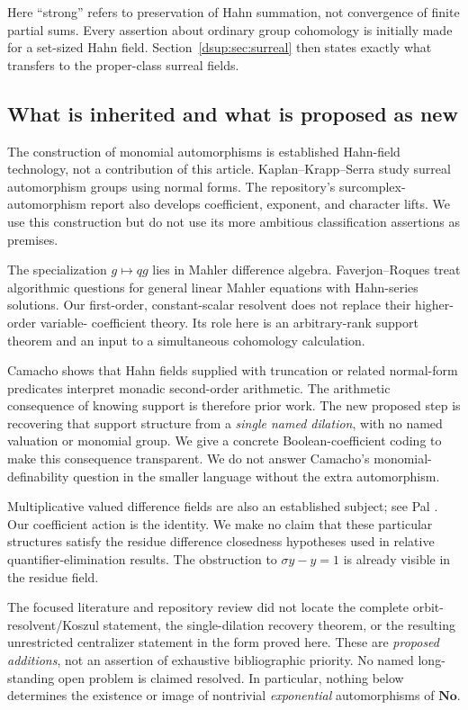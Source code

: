 \documentclass[11pt,oneside]{article}
\numberwithin{equation}{section}
\theoremstyle{definition}
\theoremstyle{remark}
\newcommand{\No}{\mathbf{No}}
\begin{document}
Here ``strong'' refers to preservation of Hahn summation, not convergence
of finite partial sums. Every assertion about ordinary group cohomology
is initially made for a set-sized Hahn field. Section~\ref{dsup:sec:surreal}
then states exactly what transfers to the proper-class surreal fields.

\subsection{What is inherited and what is proposed as new}

The construction of monomial automorphisms is established Hahn-field
technology, not a contribution of this article. Kaplan--Krapp--Serra
\cite{KKS} study surreal automorphism groups using normal forms. The
repository's surcomplex-automorphism report \cite{RepoAut} also develops
coefficient, exponent, and character lifts. We use this construction but
do not use its more ambitious classification assertions as premises.

The specialization $g\mapsto qg$ lies in Mahler difference algebra.
Faverjon--Roques \cite{FR} treat algorithmic questions for general linear
Mahler equations with Hahn-series solutions. Our first-order,
constant-scalar resolvent does not replace their higher-order variable-
coefficient theory. Its role here is an arbitrary-rank support theorem
and an input to a simultaneous cohomology calculation.

Camacho \cite{Camacho} shows that Hahn fields supplied with truncation or
related normal-form predicates interpret monadic second-order arithmetic.
The arithmetic consequence of knowing support is therefore prior work.
The new proposed step is recovering that support structure from a
\emph{single named dilation}, with no named valuation or monomial group.
We give a concrete Boolean-coefficient coding to make this consequence
transparent. We do not answer Camacho's monomial-definability question in
the smaller language without the extra automorphism.

Multiplicative valued difference fields are also an established subject;
see Pal \cite{Pal}. Our coefficient action is the identity. We make no
claim that these particular structures satisfy the residue difference
closedness hypotheses used in relative quantifier-elimination results.
The obstruction to $\sigma y-y=1$ is already visible in the residue field.

The focused literature and repository review did not locate the complete
orbit-resolvent/Koszul statement, the single-dilation recovery theorem,
or the resulting unrestricted centralizer statement in the form proved
here. These are \emph{proposed additions}, not an assertion of exhaustive
bibliographic priority. No named long-standing open problem is claimed
resolved. In particular, nothing below determines the existence or image
of nontrivial \emph{exponential} automorphisms of $\No$.
\end{document}
